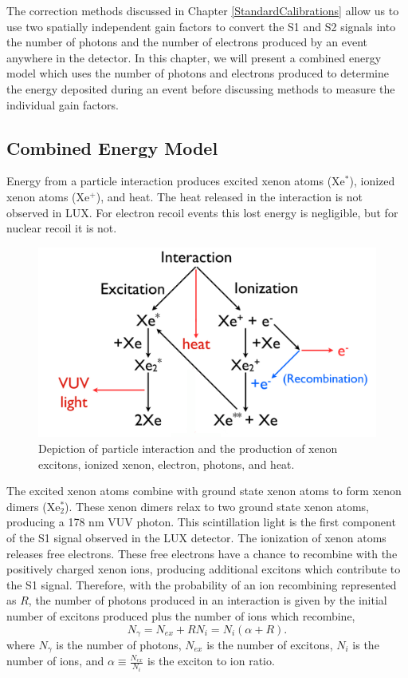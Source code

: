 \documentclass[a4paper,12pt]{article}
\begin{document}
{The correction methods discussed in Chapter \ref{StandardCalibrations} allow us to use two spatially independent gain factors to convert the S1 and S2 signals into the number of photons and the number of electrons produced by an event anywhere in the detector. In this chapter, we will present a combined energy model which uses the number of photons and electrons produced to determine the energy deposited during an event before discussing methods to measure the individual gain factors. 


\subsection{Combined Energy Model} \label{RecombSec} 


Energy from a particle interaction produces excited xenon atoms (Xe$^*$), ionized xenon atoms (Xe$^+$), and heat.  The heat released in the interaction is not observed in LUX.  For electron recoil events this lost energy is negligible, but for nuclear recoil it is not.

\begin{figure}[h]\centering
\includegraphics[scale=0.3]{InteractionPhysics.png}
\caption{Depiction of particle interaction and the production of xenon excitons, ionized xenon, electron, photons, and heat. \cite{Phelps}}
\label{fig:InteractionPhysics}
\end{figure}

The excited xenon atoms combine with ground state xenon atoms to form xenon dimers (Xe$^*_2$).  These xenon dimers relax to two ground state xenon atoms, producing a 178 nm VUV photon.  This scintillation light is the first component of the S1 signal observed in the LUX detector. The ionization of xenon atoms releases free electrons.  These free electrons have a chance to recombine with the positively charged xenon ions, producing additional excitons which contribute to the S1 signal. Therefore, with the probability of an ion recombining represented as $R$, the number of photons produced in an interaction is given by the initial number of excitons produced plus the number of ions which recombine,
\begin{equation}
N_\gamma = N_{ex} + R N_i = N_{i}  (\alpha + R).
\end{equation}
where $N_\gamma$ is the number of photons, $N_{ex}$ is the number of excitons, $N_i$ is the number of ions, and $\alpha \equiv \frac{N_{ex}}{N_i}$ is the exciton to ion ratio. 


}
\end{document}
